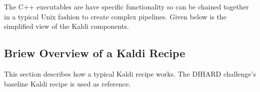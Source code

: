 	The C++ executables are have specific functionality so can be chained together in a typical Unix fashion to create complex pipelines. Given below is the simplified view of the Kaldi components.
	
	\subsection{Briew Overview of a Kaldi Recipe}
	This section describes how a typical Kaldi recipe works. The DIHARD challenge's baseline Kaldi recipe is used as reference.
	
	